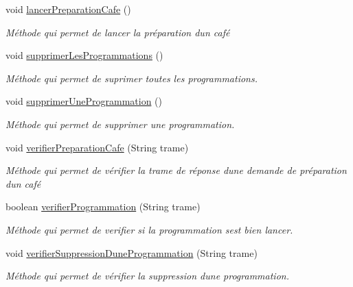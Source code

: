 \begin{DoxyCompactItemize}
void \hyperlink{classcom_1_1example_1_1ekawa_1_1_cafetiere_ac79907a8b3499bb9b2f50e31f8c904e8}{lancer\+Preparation\+Cafe} ()
\begin{DoxyCompactList}\small\item\em Méthode qui permet de lancer la préparation d\textquotesingle{}un café \end{DoxyCompactList}\item 
void \hyperlink{classcom_1_1example_1_1ekawa_1_1_cafetiere_a6d1bc4321c372f7639a3305cf74f10db}{supprimer\+Les\+Programmations} ()
\begin{DoxyCompactList}\small\item\em Méthode qui permet de suprimer toutes les programmations. \end{DoxyCompactList}\item 
void \hyperlink{classcom_1_1example_1_1ekawa_1_1_cafetiere_a40880363bf27354c1a7cb5df139fae53}{supprimer\+Une\+Programmation} ()
\begin{DoxyCompactList}\small\item\em Méthode qui permet de supprimer une programmation. \end{DoxyCompactList}\item 
void \hyperlink{classcom_1_1example_1_1ekawa_1_1_cafetiere_ac2f81a08528b9f7017bfe6183fde876f}{verifier\+Preparation\+Cafe} (String trame)
\begin{DoxyCompactList}\small\item\em Méthode qui permet de vérifier la trame de réponse d\textquotesingle{}une demande de préparation d\textquotesingle{}un café \end{DoxyCompactList}\item 
boolean \hyperlink{classcom_1_1example_1_1ekawa_1_1_cafetiere_ac3f2b337d1fd091faa312c2c6ec08bfc}{verifier\+Programmation} (String trame)
\begin{DoxyCompactList}\small\item\em Méthode qui permet de verifier si la programmation s\textquotesingle{}est bien lancer. \end{DoxyCompactList}\item 
void \hyperlink{classcom_1_1example_1_1ekawa_1_1_cafetiere_a316296ae1fad708259a403c60099caa1}{verifier\+Suppression\+Dune\+Programmation} (String trame)
\begin{DoxyCompactList}\small\item\em Méthode qui permet de vérifier la suppression d\textquotesingle{}une programmation. \end{DoxyCompactList}\end{DoxyCompactItemize}
